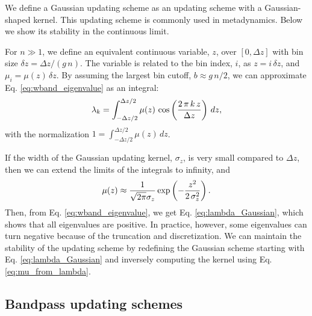 \documentclass[reprint, superscriptaddress, floatfix]{revtex4-1}
\begin{document}
We define a Gaussian updating scheme
as an updating scheme with a
Gaussian-shaped kernel.
%
This updating scheme is commonly
used in metadynamics.
%
Below we show its stability
in the continuous limit.



For $n \gg 1$,
we define an equivalent continuous variable, $z$,
over $[0, \Delta z]$
with bin size
$\delta z = \Delta z/(g \, n)$.
The variable is related to the bin index, $i$, as
$z = i \, \delta z$,
and
$\mu_i = \mu(z) \, \delta z$.
%
By assuming the largest bin cutoff, $b \approx g \, n/2$,
we can approximate Eq. \eqref{eq:wband_eigenvalue}
as an integral:
%
\begin{equation}
  \lambda_k
  =
  \int_{-\Delta z/2}^{\Delta z/2}
    \mu(z) \, \cos\left( \frac{ 2 \, \pi \, k \, z } { \Delta z} \right)
    \, d z,
  \notag
\end{equation}
%
with the normalization
$1 = \int_{-\Delta z/2}^{\Delta z/2} \mu(z) \, dz$.

If the width of the Gaussian updating kernel, $\sigma_z$,
is very small compared to $\Delta z$,
then we can extend the limits of the integrals
to infinity, and
%
\begin{equation}
  \mu(z)
  \approx
  \frac{            1            }
       { \sqrt{ 2 \pi } \sigma_z }
  \exp\left(
        -\frac{   z^2   }
              { 2 \, \sigma_z^2 }
      \right)
  .
\notag
\end{equation}
%
Then, from Eq. \eqref{eq:wband_eigenvalue},
we get Eq. \eqref{eq:lambda_Gaussian},
which shows that all eigenvalues are positive.
%
In practice, however, some eigenvalues can turn negative
because of the truncation and discretization.
%
We can maintain the stability of the updating scheme
by redefining the Gaussian scheme
starting with Eq. \eqref{eq:lambda_Gaussian}
and inversely computing the kernel using Eq. \eqref{eq:mu_from_lambda}.
%



\subsection{\label{sec:homo_bandpass}
Bandpass updating schemes}
\end{document}

